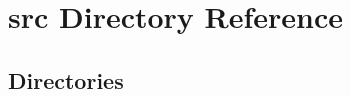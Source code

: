 \section{src Directory Reference}
\label{dir_61da4233ea5323d05f5540784565e5cf}
\subsection*{Directories}
\begin{DoxyCompactItemize}
\end{DoxyCompactItemize}
